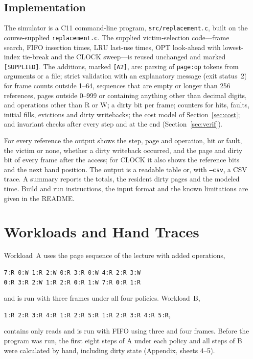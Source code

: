 \documentclass[conference,a4paper]{IEEEtran}
\newcommand{\code}[1]{\texttt{#1}}
\begin{document}
\subsection{Implementation}
The simulator is a C11 command-line program, \code{src/replacement.c}, built on the course-supplied \code{replacement.c}. The supplied victim-selection code---frame search, FIFO insertion times, LRU last-use times, OPT look-ahead with lowest-index tie-break and the CLOCK sweep---is reused unchanged and marked \code{[SUPPLIED]}. The additions, marked \code{[A2]}, are: parsing of \code{page:op} tokens from arguments or a file; strict validation with an explanatory message (exit status~2) for frame counts outside 1--64, sequences that are empty or longer than 256 references, pages outside 0--999 or containing anything other than decimal digits, and operations other than R or W; a dirty bit per frame; counters for hits, faults, initial fills, evictions and dirty writebacks; the cost model of Section~\ref{sec:cost}; and invariant checks after every step and at the end (Section~\ref{sec:verif}).

For every reference the output shows the step, page and operation, hit or fault, the victim or none, whether a dirty writeback occurred, and the page and dirty bit of every frame after the access; for CLOCK it also shows the reference bits and the next hand position. The output is a readable table or, with \code{--csv}, a CSV trace. A summary reports the totals, the resident dirty pages and the modeled time. Build and run instructions, the input format and the known limitations are given in the README.

\section{Workloads and Hand Traces}\label{sec:traces}
Workload~A uses the page sequence of the lecture with added operations,
\begin{center}\footnotesize
\code{7:R 0:W 1:R 2:W 0:R 3:R 0:W 4:R 2:R 3:W}\\
\code{0:R 3:R 2:W 1:R 2:R 0:R 1:W 7:R 0:R 1:R}
\end{center}
and is run with three frames under all four policies. Workload~B,
\begin{center}\footnotesize
\code{1:R 2:R 3:R 4:R 1:R 2:R 5:R 1:R 2:R 3:R 4:R 5:R},
\end{center}
contains only reads and is run with FIFO using three and four frames. Before the program was run, the first eight steps of A under each policy and all steps of B were calculated by hand, including dirty state (Appendix, sheets 4--5).
\end{document}
